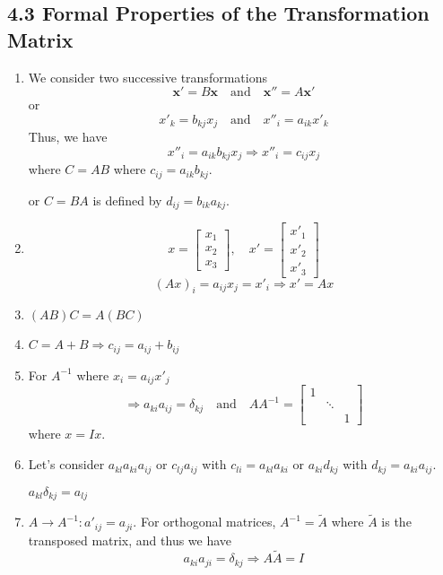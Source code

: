 \documentclass{article}
\begin{document}
	\subsection*{4.3 Formal Properties of the Transformation Matrix}
	\begin{enumerate}
		\item We consider two successive transformations
		\[
		\mathbf{x'} = B\mathbf{x} \quad \text{and} \quad \mathbf{x''} = A\mathbf{x'}
		\]
		or
		\[
		x'_k = b_{kj}x_j \quad \text{and} \quad x''_i = a_{ik}x'_k
		\]
		Thus, we have
		\[
		x''_i = a_{ik}b_{kj}x_j \Rightarrow x''_i = c_{ij}x_j
		\]
		where $C=AB$ where $c_{ij} = a_{ik}b_{kj}$.
		
		or $C=BA$ is defined by $d_{ij} = b_{ik}a_{kj}$.
		
		\item
		\[
		x = 
		\begin{bmatrix}
			x_1 \\
			x_2 \\
			x_3
		\end{bmatrix}, \quad
		x' = 
		\begin{bmatrix}
			x'_1 \\
			x'_2 \\
			x'_3
		\end{bmatrix}
		\]
		\[
		(Ax)_i = a_{ij}x_j = x'_i \Rightarrow x' = Ax
		\]
		
		\item $(AB)C = A(BC)$
		
		\item $C = A+B \Rightarrow c_{ij} = a_{ij} + b_{ij}$
		
		\item For $A^{-1}$ where $x_i = a_{ij}x'_j$
		\[
		\Rightarrow a_{ki}a_{ij} = \delta_{kj} \quad \text{and} \quad AA^{-1} = 
		\begin{bmatrix}
			1 & & \\
			& \ddots & \\
			& & 1
		\end{bmatrix}
		\]
		where $x=Ix$.
		
		\item Let's consider $a_{kl}a_{ki}a_{ij}$ or $c_{lj} a_{ij}$ with $c_{li} = a_{kl}a_{ki}$ or $a_{ki}d_{kj}$ with $d_{kj}=a_{ki}a_{ij}$.
		
		$a_{kl}\delta_{kj} = a_{lj}$
		
		\item $A \to A^{-1}: a'_{ij} = a_{ji}$. For orthogonal matrices, $A^{-1} = \tilde{A}$ where $\tilde{A}$ is the transposed matrix, and thus we have
		\[
		a_{ki}a_{ji} = \delta_{kj} \Rightarrow A\tilde{A}=I
		\]
		

\end{enumerate}
\end{document}
